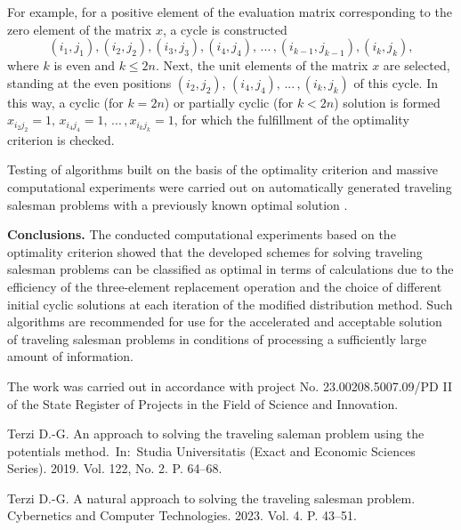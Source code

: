\documentclass[12pt]{llncs}
\begin{document}
      For example, for a positive element of the evaluation matrix corresponding to the zero element of the
     matrix $x$, a cycle is constructed
     $$(i_{1} ,j_{1} ),(i_{2} ,j_{2} ),(i_{3} ,j_{3} ),(i_{4} ,j_{4} ),\,...\,,(i_{k-1} ,j_{k-1} ),(i_{k} ,j_{k} ),$$
     where
      $k$ is even and $k \leq 2n$. Next, the unit elements of the matrix $x$ are selected, standing at the even positions
      $(i_{2} ,j_{2} ), \, (i_{4} ,j_{4} ),\,  ...\, , (i_{k} ,j_{k} )$ of this cycle. In this way, a cyclic (for $k=2n$) or partially cyclic (for $k<2n$)
       solution is formed $x_{i_{2} j_{2} } =1, \,x_{i_{4} j_{4} } =1,\,...\,, x_{i_{k} j_{k} } =1$,
       for which the fulfillment of the optimality criterion is checked.

     Testing of algorithms built on the basis of the optimality criterion and massive computational experiments were carried out on automatically
     generated traveling salesman problems with a previously known optimal solution \cite{Terzi2}.


\textbf{Conclusions.} The conducted computational experiments based on the optimality criterion showed that the developed schemes for solving traveling
 salesman problems can be classified as optimal in terms of calculations due to the efficiency of the three-element replacement operation and the choice
  of different initial cyclic solutions at each iteration of the modified distribution method. Such algorithms are recommended for use for the accelerated
  and acceptable solution of traveling salesman problems in conditions of processing a sufficiently large amount of information.

     The work was carried out in accordance with project No. 23.00208.5007.09/PD II of the State Register of Projects in the Field of Science and Innovation.
  \begin{thebibliography}{9} %

     Terzi D.-G. An approach to solving the traveling saleman problem using the potentials method.~In:~Studia Universitatis (Exact and Economic Sciences Series). 2019. Vol. 122, No. 2.  P. 64--68.

          Terzi D.-G. A natural approach to solving the traveling salesman problem. Cybernetics and Computer Technologies. 2023.  Vol. 4. P. 43--51.
     \end{thebibliography}

 
\end{document}
